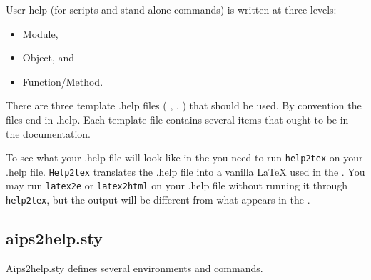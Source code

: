 User help (for scripts and stand-alone commands) is written at
three levels:
\begin{itemize}
\item Module,
\item Object, and
\item Function/Method.
\end{itemize}
There are three template .help files (
, 
, 
)
 that should be used.  By convention
the files end in .help.  Each template file contains several items
that ought to be in the documentation.

To see what your .help file will look like in the \userrefman you need to run 
\texttt{help2tex} on your .help file.  \texttt{Help2tex} translates the .help
file into
a vanilla LaTeX used in the \userrefman.
You may run \texttt{latex2e} or \texttt{latex2html} on your .help file
without running it 
through \texttt{help2tex}, but the output will be 
different from what appears in the \userrefman.

\subsection{aips2help.sty\label{197:aips2help}}
Aips2help.sty defines several environments and commands.
